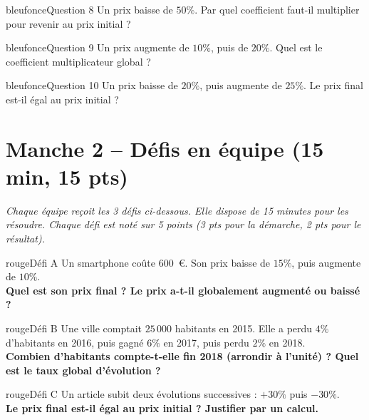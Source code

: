 \documentclass[12pt,a4paper]{article}
\begin{document}
\begin{carte}{bleufonce}{Question 8}
Un prix baisse de \(50\%\). Par quel coefficient faut-il multiplier pour revenir au prix initial ?
\end{carte}

\begin{carte}{bleufonce}{Question 9}
Un prix augmente de \(10\%\), puis de \(20\%\). Quel est le coefficient multiplicateur global ?
\end{carte}

\begin{carte}{bleufonce}{Question 10}
Un prix baisse de \(20\%\), puis augmente de \(25\%\). Le prix final est-il égal au prix initial ?
\end{carte}

\newpage

\section*{Manche 2 -- Défis en équipe (15 min, 15 pts)}

\textit{Chaque équipe reçoit les 3 défis ci-dessous. Elle dispose de 15 minutes pour les résoudre. Chaque défi est noté sur 5 points (3 pts pour la démarche, 2 pts pour le résultat).}

\vspace{0.3cm}

\begin{carte}{rouge}{Défi A}
Un smartphone coûte \(600\)~\euro{}. Son prix baisse de \(15\%\), puis augmente de \(10\%\).\\[0.2cm]
\textbf{Quel est son prix final ? Le prix a-t-il globalement augmenté ou baissé ?}
\end{carte}

\begin{carte}{rouge}{Défi B}
Une ville comptait \(25\,000\) habitants en 2015. Elle a perdu \(4\%\) d'habitants en 2016, puis gagné \(6\%\) en 2017, puis perdu \(2\%\) en 2018.\\[0.2cm]
\textbf{Combien d'habitants compte-t-elle fin 2018 (arrondir à l'unité) ? Quel est le taux global d'évolution ?}
\end{carte}

\begin{carte}{rouge}{Défi C}
Un article subit deux évolutions successives : \(+30\%\) puis \(-30\%\).\\[0.2cm]
\textbf{Le prix final est-il égal au prix initial ? Justifier par un calcul.}
\end{carte}
\end{document}
